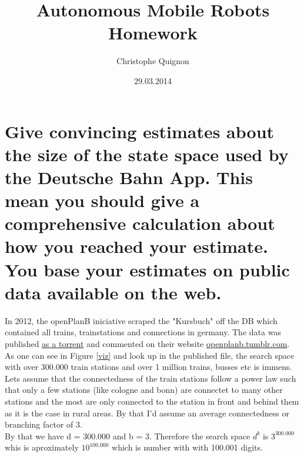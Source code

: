 \documentclass{scrartcl}
\author{Christophe Quignon}
\date{29.03.2014}
\title{Autonomous Mobile Robots Homework}
\begin{document}
\maketitle

\section{Give convincing estimates about the size of the state space used by the Deutsche Bahn App. This mean you should give a comprehensive calculation about how you reached your estimate. You base your estimates on public data available on the web.}
In 2012, the openPlanB iniciative scraped the "Kursbuch" off the DB which contained all trains, trainstations and connections in germany. The data was published \href{https://dl.dropbox.com/s/xonu0zy4wds5oua/openPlanB_\%20ODbL1.0_2012-09-04.torrent?dl=1}{as a torrent} and commented on their website \href{http://openplanb.tumblr.com/post/30878899005/die-ersten-fahrplandaten}{openplanb.tumblr.com}. As one can see in Figure \ref{viz} and look up in the published file, the search space with over 300.000 train stations and over 1 million trains, busses etc is immens.\\
Lets assume that the connectedness of the train stations follow a power law such that only a few stations (like cologne and bonn) are connectet to many other stations and the most are only connected to the station in front and behind them as it is the case in rural areas. By that I'd assume an average connectedness or branching factor of 3.\\
By that we have d = 300.000 and b = 3. Therefore the search space $d^{b}$ is $3^{300.000}$ whis is aproximately $10^{100.000}$ which is number with with 100.001 digits.
\end{document}
